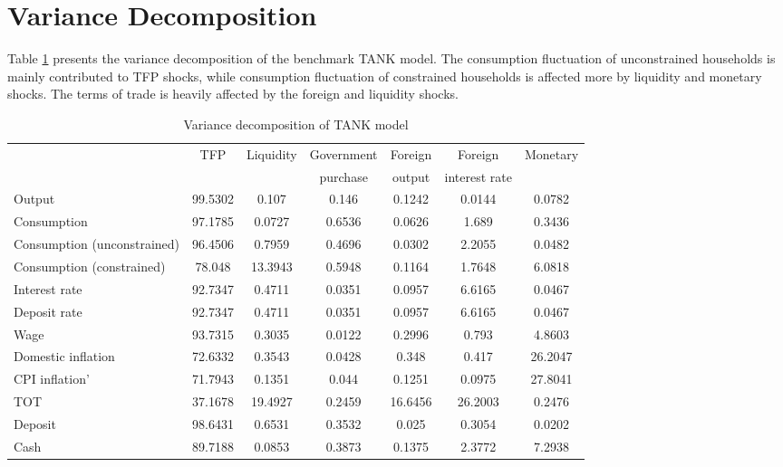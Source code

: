 \documentclass[12pt]{article}
\begin{document}
    
    
\clearpage
\section{Variance Decomposition}
Table \ref{variance} presents the variance decomposition of the benchmark TANK model. The consumption fluctuation of unconstrained households is mainly contributed to TFP shocks, while consumption fluctuation of constrained households is affected more by liquidity and monetary shocks. The terms of trade is heavily affected by the foreign and liquidity shocks.
\begin{table}[h!]
\centering 
\scriptsize
\begin{tabular}{lcccccc}
\hline \hline
                                    & TFP     & Liquidity & Government  & Foreign & Foreign & Monetary \\
                                    &     &  & purchase &  output & interest rate &  \\\hline
Output                              & 99.5302 & 0.107     & 0.146               & 0.1242         & 0.0144                & 0.0782   \\
Consumption                         & 97.1785 & 0.0727    & 0.6536              & 0.0626         & 1.689                 & 0.3436   \\
Consumption (unconstrained)         & 96.4506 & 0.7959    & 0.4696              & 0.0302         & 2.2055                & 0.0482   \\
Consumption (constrained)           & 78.048  & 13.3943   & 0.5948              & 0.1164         & 1.7648                & 6.0818   \\
Interest rate                       & 92.7347 & 0.4711    & 0.0351              & 0.0957         & 6.6165                & 0.0467   \\
Deposit rate & 92.7347 & 0.4711    & 0.0351              & 0.0957         & 6.6165                & 0.0467   \\
Wage                                & 93.7315 & 0.3035    & 0.0122              & 0.2996         & 0.793                 & 4.8603   \\
Domestic inflation                  & 72.6332 & 0.3543    & 0.0428              & 0.348          & 0.417                 & 26.2047  \\
CPI inflation'                      & 71.7943 & 0.1351    & 0.044               & 0.1251         & 0.0975                & 27.8041  \\
TOT                                 & 37.1678 & 19.4927   & 0.2459              & 16.6456        & 26.2003               & 0.2476   \\
Deposit                             & 98.6431 & 0.6531    & 0.3532              & 0.025          & 0.3054                & 0.0202   \\
Cash                                & 89.7188 & 0.0853    & 0.3873              & 0.1375         & 2.3772                & 7.2938   \\\hline
\end{tabular}
\caption{Variance decomposition of TANK model}
\label{variance}
\end{table}
\end{document}
